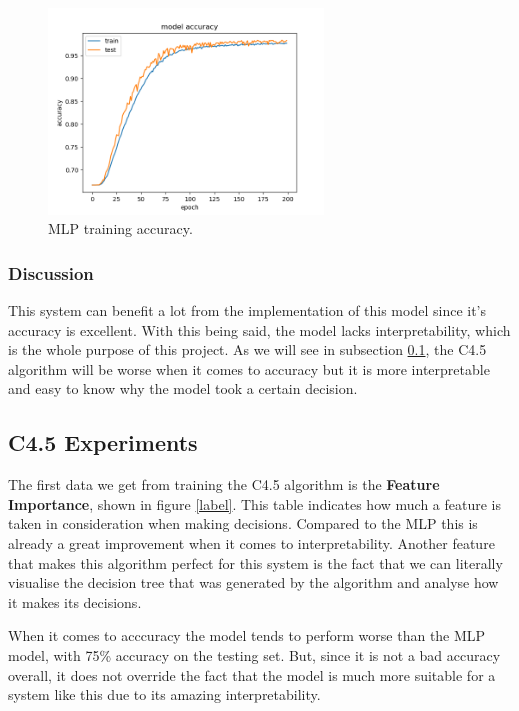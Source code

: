 \documentclass[12pt,a4paper,oneside]{memoir}
\begin{document}
\begin{figure}[H]
	\centering
	\includegraphics[width=0.65\textwidth]{images/accuracy_mlp.png}
	\caption{\acs{MLP} training accuracy.}
	\centering
	\label{fig:accuracy_mlp}
\end{figure}

\subsubsection{Discussion}
This system can benefit a lot from the implementation of this model since it's accuracy is excellent. With this being said, the model lacks interpretability, which is the whole purpose of this project. As we will see in subsection \ref{sub:C4.5}, the C4.5 algorithm will be worse when it comes to accuracy but it is more interpretable and easy to know why the model took a certain decision.


\subsection{\acs{C4.5} Experiments}
\label{sub:C4.5}
The first data we get from training the C4.5 algorithm is the \textbf{Feature Importance}, shown in figure \ref{label}. This table indicates how much a feature is taken in consideration when making decisions. Compared to the \acs{MLP} this is already a great improvement when it comes to interpretability. Another feature that makes this algorithm perfect for this system is the fact that we can literally visualise the decision tree that was generated by the algorithm and analyse how it makes its decisions.


 \par
 
 When it comes to acccuracy the model tends to perform worse than the \acs{MLP} model, with 75\% accuracy on the testing set. But, since it is not a bad accuracy overall, it does not override the fact that the model is much more suitable for a system like this due to its amazing interpretability.
\end{document}

